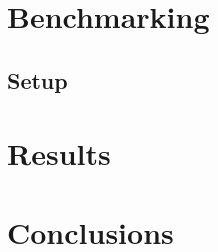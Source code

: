 \documentclass{sig-alternate}
\begin{document}
\section{Benchmarking}
\subsection{Setup}

\section{Results}

\section{Conclusions}
\end{document}
